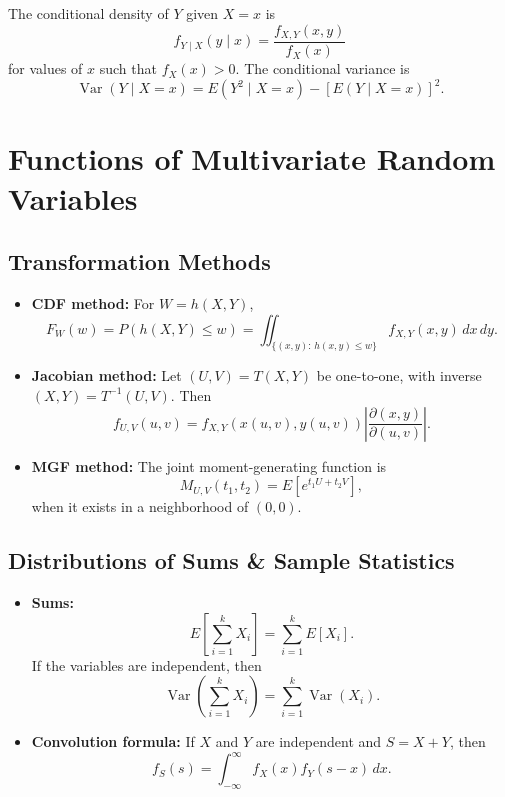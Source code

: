 \documentclass[12pt,a4paper]{article}
\begin{document}
\begin{defbox}[title=Conditional Distributions]
The conditional density of $Y$ given $X=x$ is
\[
    f_{Y\mid X}(y\mid x)=\frac{f_{X,Y}(x,y)}{f_X(x)}
\]
for values of $x$ such that $f_X(x)>0$. The conditional variance is
\[
    \operatorname{Var}(Y\mid X=x)
    =E(Y^2\mid X=x)-[E(Y\mid X=x)]^2.
\]
\end{defbox}


\section{Functions of Multivariate Random Variables}

\subsection{Transformation Methods}
\begin{itemize}
    \item \textbf{CDF method:} For $W=h(X,Y)$,
    \[
        F_W(w)=P(h(X,Y)\le w)
        =\iint_{\{(x,y):\,h(x,y)\le w\}}
        f_{X,Y}(x,y)\,dx\,dy.
    \]
    \item \textbf{Jacobian method:} Let $(U,V)=T(X,Y)$ be one-to-one,
    with inverse $(X,Y)=T^{-1}(U,V)$. Then
    \[
        f_{U,V}(u,v)
        =f_{X,Y}\!\left(x(u,v),y(u,v)\right)
        \left|
            \frac{\partial(x,y)}{\partial(u,v)}
        \right|.
    \]
    \item \textbf{MGF method:} The joint moment-generating function is
    \[
        M_{U,V}(t_1,t_2)=E\!\left[e^{t_1U+t_2V}\right],
    \]
    when it exists in a neighborhood of $(0,0)$.
\end{itemize}

\subsection{Distributions of Sums \& Sample Statistics}
\begin{itemize}
    \item \textbf{Sums:}
    \[
        E\!\left[\sum_{i=1}^kX_i\right]
        =\sum_{i=1}^kE[X_i].
    \]
    If the variables are independent, then
    \[
        \operatorname{Var}\!\left(\sum_{i=1}^kX_i\right)
        =\sum_{i=1}^k\operatorname{Var}(X_i).
    \]
    \item \textbf{Convolution formula:} If $X$ and $Y$ are independent and
    $S=X+Y$, then
    \[
        f_S(s)=\int_{-\infty}^{\infty}f_X(x)f_Y(s-x)\,dx.
    \]
\end{itemize}
\end{document}
